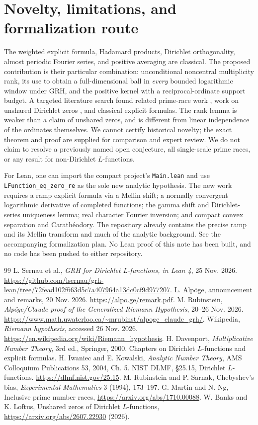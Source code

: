 \documentclass[11pt]{article}
\theoremstyle{remark}\newtheorem{remark}[theorem]{Remark}
\begin{document}
\section{Novelty, limitations, and formalization route}
The weighted explicit formula, Hadamard products, Dirichlet orthogonality, almost periodic Fourier series, and positive averaging are classical. The proposed contribution is their particular combination: unconditional noncentral multiplicity rank, its use to obtain a full-dimensional ball in \emph{every} bounded logarithmic window under GRH, and the positive kernel with a reciprocal-ordinate support budget. A targeted literature search found related prime-race work \cite{rubinsarnak,martinng}, work on unshared Dirichlet zeros \cite{banks}, and classical explicit formulas. The rank lemma is weaker than a claim of unshared zeros, and is different from linear independence of the ordinates themselves. We cannot certify historical novelty; the exact theorem and proof are supplied for comparison and expert review. We do not claim to resolve a previously named open conjecture, all single-scale prime races, or any result for non-Dirichlet $L$-functions.

For Lean, one can import the compact project's \texttt{Main.lean} and use \texttt{LFunction\_eq\_zero\_re} as the sole new analytic hypothesis. The new work requires a ramp explicit formula via a Mellin shift; a normally convergent logarithmic derivative of completed functions; the gamma shift and Dirichlet-series uniqueness lemma; real character Fourier inversion; and compact convex separation and Carath\'eodory. The repository already contains the precise ramp and its Mellin transform and much of the analytic background. See the accompanying formalization plan. No Lean proof of this note has been built, and no code has been pushed to either repository.

\begin{thebibliography}{99}\small
{} L. Sernau et al., \emph{GRH for Dirichlet L-functions, in Lean 4}, 25 Nov. 2026. \url{https://github.com/lsernau/grh-lean/tree/72fead102f663d5c7a407964a13dc0cf9d977207}.
 L. Alp\"oge, announcement and remarks, 20 Nov. 2026. \url{https://alpo.ge/remark.pdf}.
 M. Rubinstein, \emph{Alp\"oge/Claude proof of the Generalized Riemann Hypothesis}, 20--26 Nov. 2026. \url{https://www.math.uwaterloo.ca/~mrubinst/alpoge_claude_grh/}.
 Wikipedia, \emph{Riemann hypothesis}, accessed 26 Nov. 2026. \url{https://en.wikipedia.org/wiki/Riemann_hypothesis}.
 H. Davenport, \emph{Multiplicative Number Theory}, 3rd ed., Springer, 2000. Chapters on Dirichlet $L$-functions and explicit formulas.
 H. Iwaniec and E. Kowalski, \emph{Analytic Number Theory}, AMS Colloquium Publications 53, 2004, Ch. 5.
 NIST DLMF, \S25.15, Dirichlet $L$-functions. \url{https://dlmf.nist.gov/25.15}.
 M. Rubinstein and P. Sarnak, Chebyshev's bias, \emph{Experimental Mathematics} 3 (1994), 173--197.
 G. Martin and N. Ng, Inclusive prime number races, \url{https://arxiv.org/abs/1710.00088}.
 W. Banks and K. Loftus, Unshared zeros of Dirichlet $L$-functions, \url{https://arxiv.org/abs/2607.22930} (2026).
\end{thebibliography}
\end{document}
